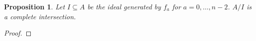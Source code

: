 \documentclass{article}
\numberwithin{equation}{section}
\newtheorem{proposition}[equation]{Proposition}
\begin{document}
\begin{proposition}\label{prop:ci} Let $I \subseteq A$ be the ideal generated by $f_a$ for $a=0,\dots,n-2$. $A/I$ is a complete intersection. 
\end{proposition}

\begin{proof} 

%
%
%
%
%
\end{proof}
\end{document}
